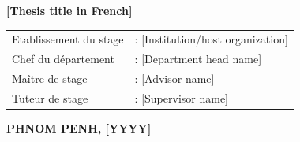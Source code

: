 \documentclass[12pt, a4paper]{article}
\begin{document}
\vspace{2em}
\begin{center}
\textbf{[Thesis title in French]}
\end{center}

\vspace{2em}
\bfseries
\begin{tabular}{@{}p{5cm}l@{}}
Etablissement du stage & : [Institution/host organization] \\[1em]
Chef du département & : [Department head name] \underline{\hspace{3cm}} \\[1em]
Maître de stage & : [Advisor name] \underline{\hspace{3cm}} \\[1em]
Tuteur de stage & : [Supervisor name] \underline{\hspace{3cm}} \\
\end{tabular}
\normalfont

\vspace{2em}
\begin{center}
\textbf{PHNOM PENH, [YYYY]}
\end{center}
\end{document}
